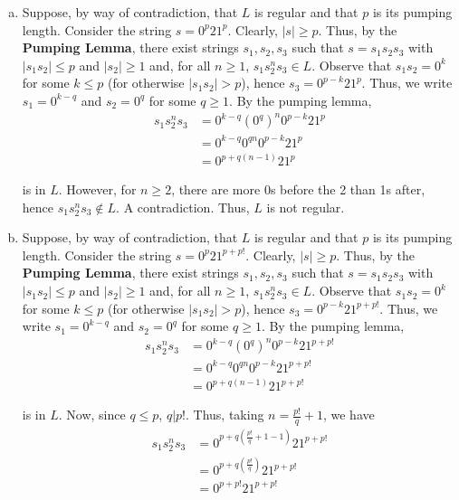 \begin{solution}\mbox{\\}
\begin{enumerate}[(a)]
    \item Suppose, by way of contradiction, that \(L\) is regular and that \(p\) is its pumping length. Consider the string \(s=0^p21^p\). Clearly, \(|s|\geq p\). Thus, by the \textbf{Pumping Lemma}, there exist strings \(s_1, s_2, s_3\) such that \(s=s_1s_2s_3\) with \(|s_1s_2|\leq p\) and \(|s_2|\geq1\) and, for all \(n\geq 1\), \(s_1s_2^ns_3\in L\). Observe that \(s_1s_2=0^k\) for some \(k\leq p\) (for otherwise \(|s_1s_2| > p\)), hence \(s_3=0^{p-k}21^p\). Thus, we write \(s_1=0^{k-q}\) and \(s_2=0^{q}\) for some \(q\geq1\). By the pumping lemma, 
    \begin{align*}
        s_1s_2^ns_3 &= 0^{k-q}(0^q)^n0^{p-k}21^p\\
                    &= 0^{k-q}0^{qn}0^{p-k}21^p\\
                    &= 0^{p+q(n-1)}21^p
    \end{align*}

    is in \(L\). However, for \(n\geq2\), there are more 0s before the 2 than 1s after, hence \(s_1s_2^ns_3\not\in L\). A contradiction. Thus, \(L\) is not regular.

    \item Suppose, by way of contradiction, that \(L\) is regular and that \(p\) is its pumping length. Consider the string \(s=0^p21^{p+p!}\). Clearly, \(|s|\geq p\). Thus, by the \textbf{Pumping Lemma}, there exist strings \(s_1, s_2, s_3\) such that \(s=s_1s_2s_3\) with \(|s_1s_2|\leq p\) and \(|s_2|\geq1\) and, for all \(n\geq 1\), \(s_1s_2^ns_3\in L\). Observe that \(s_1s_2=0^k\) for some \(k\leq p\) (for otherwise \(|s_1s_2| > p\)), hence \(s_3=0^{p-k}21^{p+p!}\). Thus, we write \(s_1=0^{k-q}\) and \(s_2=0^{q}\) for some \(q\geq1\). By the pumping lemma, 
    \begin{align*}
        s_1s_2^ns_3 &= 0^{k-q}(0^q)^n0^{p-k}21^{p+p!}\\
                    &= 0^{k-q}0^{qn}0^{p-k}21^{p+p!}\\
                    &= 0^{p+q(n-1)}21^{p+p!}
    \end{align*}

    is in \(L\). Now, since \(q\leq p\), \(q|p!\). Thus, taking \(n=\frac{p!}{q}+1\), we have 
    \begin{align*}
        s_1s_2^ns_3 &= 0^{p+q(\frac{p!}{q}+1-1)}21^{p+p!}\\
                    &= 0^{p+q(\frac{p!}{q})}21^{p+p!}\\
                    &= 0^{p+p!}21^{p+p!}
    \end{align*}
    

\end{enumerate}
\end{solution}
